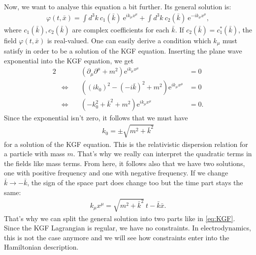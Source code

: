 \vspace{10pt}

Now, we want to analyse this equation a bit further. Its general solution is:
\begin{align}\label{eq:KGF}
\varphi(t,\bar{x}) = \displaystyle\int d^3 k \ c_1(\bar{k}) \ \text{e}^{i k_{\mu} x^{\mu}} + \displaystyle\int d^3 k \ c_2(\bar{k}) \ \text{e}^{- i k_{\mu} x^{\mu}},
\end{align}
where $c_1(\bar{k}), c_2(\bar{k})$ are complex coefficients for each $\bar{k}$. If $c_2(\bar{k}) = c_1^*(\bar{k})$, the field $\varphi(t,\bar{x})$ is real-valued. One can easily derive a condition which $k_{\mu}$ must satisfy in order to be a solution of the KGF equation. Inserting the plane wave exponential into the KGF equation, we get 
\begin{alignat*}{2}
    &\qquad& (\partial_{\mu} \partial^{\mu} + m^2) \text{e}^{i k_{\mu} x^{\mu}} &= 0 \\
    &\Leftrightarrow& \left((i k_0)^2 - (- i \bar{k})^2 + m^2 \right) \text{e}^{i k_{\mu} x^{\mu}} &= 0 \\
    &\Leftrightarrow& \left( - k_0^2 + \bar{k}^2 + m^2 \right) \text{e}^{i k_{\mu} x^{\mu}} &= 0 .
\end{alignat*}
Since the exponential isn't zero, it follows that we must have
\begin{align}
k_0 = \pm \sqrt{m^2 + \bar{k}^2}
\end{align}
for a solution of the KGF equation. This is the relativistic dispersion relation for a particle with
mass $m$. That's why we really can interpret the quadratic terms in the fields like mass terms. From here, it follows also that we have two solutions, one with positive frequency and one with negative frequency. If we change $\bar{k} \rightarrow -\bar{k}$, the sign of the space part does change too but the time part stays the same:
\begin{align}
k_{\mu} x^{\mu} = \sqrt{m^2 + \bar{k}^2} \ t - \bar{k} \bar{x}.
\end{align} 
That's why we can split the general solution into two parts like in \eqref{eq:KGF}. Since the KGF Lagrangian is regular, we have no constraints. In electrodynamics, this is not the case anymore and we will see how constraints enter into the Hamiltonian description.